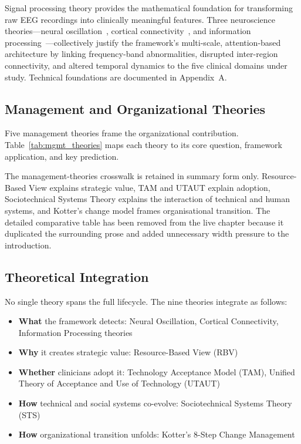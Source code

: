 Signal processing theory provides the mathematical foundation for transforming raw EEG recordings into clinically meaningful features. Three neuroscience theories---neural oscillation~\cite{buzsaki2012brain}, cortical connectivity~\cite{niedermeyer2005eeg}, and information processing~\cite{roy2019eeg}---collectively justify the framework's multi-scale, attention-based architecture by linking frequency-band abnormalities, disrupted inter-region connectivity, and altered temporal dynamics to the five clinical domains under study. Technical foundations are documented in Appendix~A.

\subsection{Management and Organizational Theories}

Five management theories frame the organizational contribution. Table~\ref{tab:mgmt_theories} maps each theory to its core question, framework application, and key prediction.


The management-theories crosswalk is retained in summary form only. Resource-Based View explains strategic value, TAM and UTAUT explain adoption, Sociotechnical Systems Theory explains the interaction of technical and human systems, and Kotter's change model frames organisational transition. The detailed comparative table has been removed from the live chapter because it duplicated the surrounding prose and added unnecessary width pressure to the introduction.

\label{tab:mgmt_theories}

\subsection{Theoretical Integration}

No single theory spans the full lifecycle. The nine theories integrate as follows:
\begin{itemize}
    \item \textbf{What} the framework detects: Neural Oscillation, Cortical Connectivity, Information Processing theories
    \item \textbf{Why} it creates strategic value: Resource-Based View (RBV)
    \item \textbf{Whether} clinicians adopt it: Technology Acceptance Model (TAM), Unified Theory of Acceptance and Use of Technology (UTAUT)
    \item \textbf{How} technical and social systems co-evolve: Sociotechnical Systems Theory (STS)
    \item \textbf{How} organizational transition unfolds: Kotter's 8-Step Change Management
\end{itemize}

